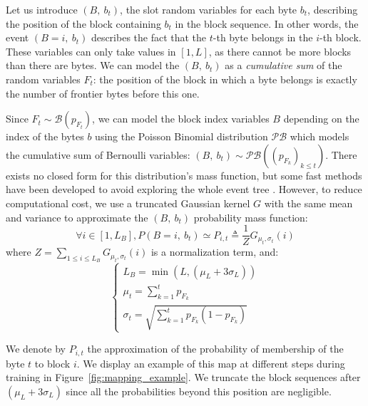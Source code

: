 Let us introduce $(B,\ b_t)$, the slot random variables for each byte $b_t$, describing the position of the block containing $b_t$ in the block sequence. In other words, the event $(B=i,\ b_t)$ describes the fact that the $t$-th byte belongs in the $i$-th block. These variables can only take values in $[1, L]$, as there cannot be more blocks than there are bytes. We can model the $(B,\ b_t)$ as a \textit{cumulative sum} of the random variables $F_t$: the position of the block in which a byte belongs is exactly the number of frontier bytes before this one.

Since $F_t \sim \mathcal{B}(p_{F_t})$, we can model the block index variables $B$ depending on the index of the bytes $b$ using the Poisson Binomial distribution $\mathcal{PB}$ which models the cumulative sum of Bernoulli variables: $\left(B,\ b_t\right) \sim \mathcal{PB}\left(\left(p_{F_k}\right)_{k \leq t}\right)$. There exists no closed form for this distribution's mass function, but some fast methods have been developed to avoid exploring the whole event tree \cite{BISCARRI201892, poibin_fft}. However, to reduce computational cost, we use a truncated Gaussian kernel $G$ with the same mean and variance to approximate the $(B,\ b_t)$ probability mass function:
$$
\forall i \in [1, L_B], P\left(B = i,\ b_t\right) \simeq P_{i,t} \triangleq \frac{1}{Z}G_{\mu_t, \sigma_t}(i)
$$
where $Z=\sum\limits_{1\leq i\leq L_B}G_{\mu_t, \sigma_t}(i)$ is a normalization term, and:
\begin{equation}
  \begin{cases}
    L_B = \min\left(L, \left(\mu_L + 3\sigma_L\right)\right)\\[11pt]
    \mu_t = \sum_{k=1}^{t} p_{F_k} \\[11pt]
    \sigma_t = \sqrt{\sum_{k=1}^{t} p_{F_k}\left(1-p_{F_k}\right)}
  \end{cases}
\end{equation}

We denote by $P_{i,t}$ the approximation of the probability of membership of the byte $t$ to block $i$. We display an example of this map at different steps during training in Figure~\ref{fig:mapping_example}. We truncate the block sequences after $(\mu_L + 3\sigma_L)$ since all the probabilities beyond this position are negligible.


